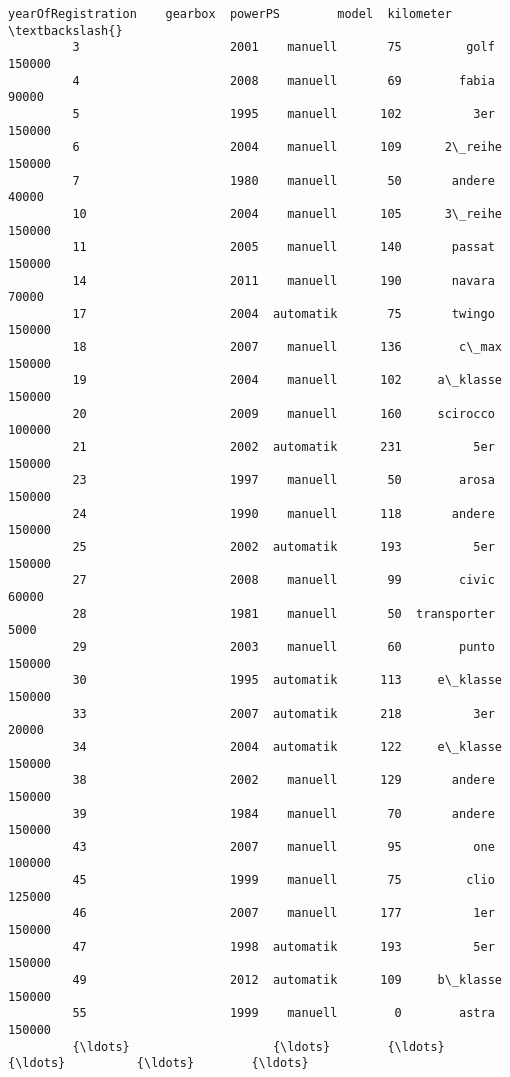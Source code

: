 \documentclass[11pt]{article}
\begin{document}
\begin{Verbatim}[commandchars=\\\{\}]
                 yearOfRegistration    gearbox  powerPS        model  kilometer  \textbackslash{}
         3                     2001    manuell       75         golf     150000   
         4                     2008    manuell       69        fabia      90000   
         5                     1995    manuell      102          3er     150000   
         6                     2004    manuell      109      2\_reihe     150000   
         7                     1980    manuell       50       andere      40000   
         10                    2004    manuell      105      3\_reihe     150000   
         11                    2005    manuell      140       passat     150000   
         14                    2011    manuell      190       navara      70000   
         17                    2004  automatik       75       twingo     150000   
         18                    2007    manuell      136        c\_max     150000   
         19                    2004    manuell      102     a\_klasse     150000   
         20                    2009    manuell      160     scirocco     100000   
         21                    2002  automatik      231          5er     150000   
         23                    1997    manuell       50        arosa     150000   
         24                    1990    manuell      118       andere     150000   
         25                    2002  automatik      193          5er     150000   
         27                    2008    manuell       99        civic      60000   
         28                    1981    manuell       50  transporter       5000   
         29                    2003    manuell       60        punto     150000   
         30                    1995  automatik      113     e\_klasse     150000   
         33                    2007  automatik      218          3er      20000   
         34                    2004  automatik      122     e\_klasse     150000   
         38                    2002    manuell      129       andere     150000   
         39                    1984    manuell       70       andere     150000   
         43                    2007    manuell       95          one     100000   
         45                    1999    manuell       75         clio     125000   
         46                    2007    manuell      177          1er     150000   
         47                    1998  automatik      193          5er     150000   
         49                    2012  automatik      109     b\_klasse     150000   
         55                    1999    manuell        0        astra     150000   
         {\ldots}                    {\ldots}        {\ldots}      {\ldots}          {\ldots}        {\ldots}   

\end{Verbatim}
\end{document}
